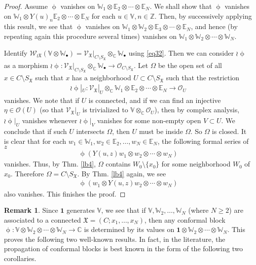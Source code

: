 \documentclass[12pt,a4paper,notitlepage]{article}
\theoremstyle{definition}
\newtheorem{rem}[df]{Remark}
\theoremstyle{plain}
\newcommand{\fk}{\mathfrak}
\newcommand{\id}{\mathbf{1}}
\newcommand{\scr}{\mathscr}
\newcommand{\SX}{{S_{\fk X}}}
\newcommand{\blt}{\bullet}
\newcommand{\Vbb}{\mathbb V}
\newcommand{\Wbb}{\mathbb W}
\newcommand{\Cbb}{\mathbb C}
\newcommand{\Zbb}{\mathbb Z}
\newcommand{\Ebb}{\mathbb E}
\numberwithin{equation}{section}
\begin{document}
\begin{proof}
Assume $\upphi$ vanishes on $\Wbb_1\otimes\Ebb_2\otimes\cdots\otimes\Ebb_N$. We shall show that $\upphi$ vanishes on $\Wbb_1\otimes Y(u)_n\Ebb_2\otimes\cdots\otimes\Ebb_N$ for each $u\in\Vbb,n\in\Zbb$. Then, by successively applying this result, we see that $\upphi$ vanishes on $\Wbb_1\otimes\Wbb_2\otimes\Ebb_3\otimes\cdots\otimes\Ebb_N$, and hence (by repeating again this procedure several times) vanishes on $\Wbb_1\otimes\Wbb_2\otimes\cdots\otimes\Wbb_N$.

Identify $\scr W_{\wr\fk X}(\Vbb\otimes\Wbb_\blt)=\scr V_{\fk X}\big|_{C\setminus\SX}\otimes_\Cbb\Wbb_\blt$ using \eqref{eq32}. Then we can consider $\wr\upphi$ as a morphism $\wr\upphi:\scr V_{\fk X}\big|_{C\setminus\SX}\otimes_\Cbb\Wbb_\blt\rightarrow\scr O_{C\setminus\SX}$. Let $\Omega$ be the open set of all $x\in C\setminus\SX$ such that $x$ has a neighborhood $U\subset C\setminus\SX$ such that the restriction
\begin{align*}
\wr\upphi|_U:\scr V_{\fk X}|_U\otimes_\Cbb\Wbb_1\otimes\Ebb_2\otimes\cdots\otimes\Ebb_N\rightarrow\scr O_U	
\end{align*}
vanishes. We note that if $U$ is connected, and if we can find an injective $\eta\in\scr O(U)$ (so that $\scr V_{\fk X}|_U$ is trivialized to $\Vbb\otimes_\Cbb\scr O_U$), then by complex analysis, $\wr\upphi|_U$ vanishes whenever $\wr\upphi|_V$ vanishes for some non-empty open $V\subset U$. We conclude that if such $U$ intersects $\Omega$, then $U$ must be inside $\Omega$. So $\Omega$ is closed. It is clear that for each $w_1\in\Wbb_1,w_2\in\Ebb_2,\dots,w_N\in\Ebb_N$, the following formal series of $z$
\begin{align*}
\upphi(Y(u,z)w_1\otimes w_2\otimes\cdots\otimes w_N)	
\end{align*}
vanishes. Thus, by Thm. \ref{lb4}, $\Omega$ contains $W_0\setminus\{x_0\}$ for some neighborhood $W_0$ of $x_0$. Therefore $\Omega=C\setminus\SX$. By Thm. \ref{lb4} again, we see
\begin{align*}
\upphi(w_1\otimes Y(u,z)w_2\otimes\cdots\otimes w_N)	
\end{align*}
also vanishes. This finishes the proof.
\end{proof}

\begin{rem}\label{lb14}
Since $\id$ generates $\Vbb$, we see that if $\Vbb,\Wbb_2,\dots,\Wbb_N$ (where $N\geq 2$) are associated to a connected $\fk X=(C;x_1,\dots,x_N)$, then any conformal block $\upphi:\Vbb\otimes\Wbb_2\otimes\cdots\otimes\Wbb_N\rightarrow\Cbb$ is determined by its values on $\id\otimes\Wbb_2\otimes\cdots\otimes\Wbb_N$. This proves the following two well-known results. In fact, in the literature, the propagation of conformal blocks is best known in the form of the following two corollaries.
\end{rem}
\end{document}
